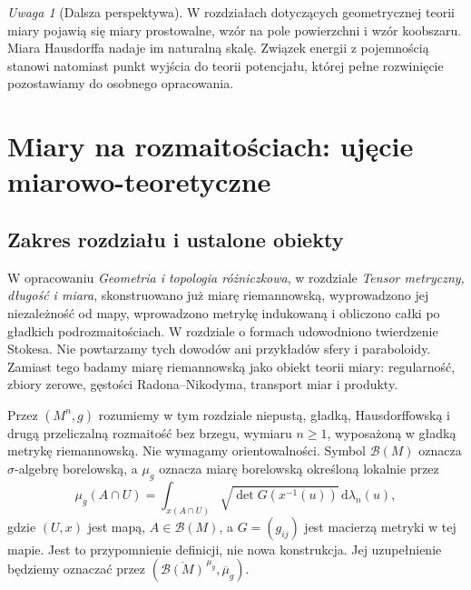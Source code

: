 \documentclass[11pt,a4paper,oneside]{book}
\numberwithin{equation}{chapter}
\theoremstyle{plain}
\theoremstyle{definition}
\theoremstyle{remark}
\newtheorem{uwaga}[twierdzenie]{Uwaga}
\begin{document}
\begin{uwaga}[Dalsza perspektywa]
W rozdziałach dotyczących geometrycznej teorii miary
pojawią się miary prostowalne, wzór na pole powierzchni
i wzór koobszaru. Miara Hausdorffa nadaje im naturalną
skalę. Związek energii z pojemnością stanowi natomiast
punkt wyjścia do teorii potencjału, której pełne
rozwinięcie pozostawiamy do osobnego opracowania.
\end{uwaga}



\chapter[Miary na rozmaitościach]{Miary na rozmaitościach: ujęcie miarowo-teoretyczne}
\label{ch:miary-rozmaitosci-27}

\section{Zakres rozdziału i ustalone obiekty}
W opracowaniu \emph{Geometria i topologia różniczkowa}, w rozdziale
\emph{Tensor metryczny, długość i miara}, skonstruowano już
miarę riemannowską, wyprowadzono jej niezależność od mapy,
wprowadzono metrykę indukowaną i obliczono całki po gładkich
podrozmaitościach. W rozdziale o formach udowodniono twierdzenie
Stokesa. Nie powtarzamy tych dowodów ani przykładów
sfery i paraboloidy. Zamiast tego badamy miarę riemannowską
jako obiekt teorii miary: regularność, zbiory zerowe,
gęstości Radona--Nikodyma, transport miar i produkty.

Przez $(M^n,g)$ rozumiemy w tym rozdziale niepustą, gładką,
Hausdorffowską i drugą przeliczalną rozmaitość bez brzegu,
wymiaru $n\ge1$, wyposażoną w gładką metrykę riemannowską.
Nie wymagamy orientowalności. Symbol $\mathcal B(M)$ oznacza
$\sigma$-algebrę borelowską, a $\mu_g$ oznacza miarę
borelowską określoną lokalnie przez
\begin{equation}\label{eq:g-density-27}
  \mu_g(A\cap U)=\int_{x(A\cap U)}
  \sqrt{\det G(x^{-1}(u))}\,\mathrm d\lambda_n(u),
\end{equation}
gdzie $(U,x)$ jest mapą, $A\in\mathcal B(M)$,
a $G=(g_{ij})$ jest macierzą metryki w tej mapie.
Jest to przypomnienie definicji, nie nowa konstrukcja.
Jej uzupełnienie będziemy oznaczać przez
$(\overline{\mathcal B(M)}^{\,\mu_g},\overline\mu_g)$.
\end{document}
